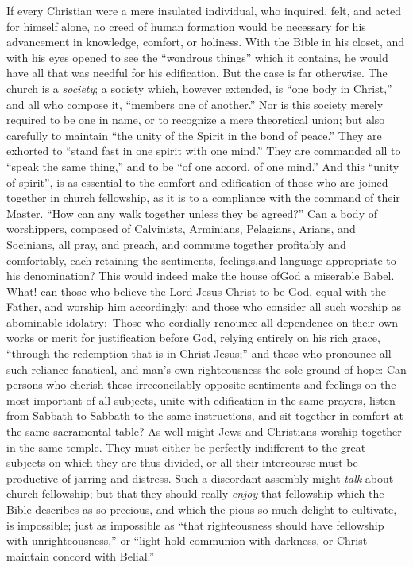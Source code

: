 \documentclass[
]{book}
\begin{document}
If every Christian were a mere insulated individual, who inquired, felt, and acted for himself alone, no creed of human formation would be necessary for his advancement in knowledge, comfort, or holiness. With the Bible in his closet, and with his eyes opened to see the ``wondrous things'' which it contains, he would have all that was needful for his edification. But the case is far otherwise. The church is a \emph{society}; a society which, however extended, is ``one body in Christ,'' and all who compose it, ``members one of another.'' Nor is this society merely required to be one in name, or to recognize a mere theoretical union; but also carefully to maintain ``the unity of the Spirit in the bond of peace.'' They are exhorted to ``stand fast in one spirit with one mind.'' They are commanded all to ``speak the same thing,'' and to be ``of one accord, of one mind.'' And this ``unity of spirit'', is as essential to the comfort and edification of those who are joined together in church fellowship, as it is to a compliance with the command of their Master. ``How can any walk together unless they be agreed?'' Can a body of worshippers, composed of Calvinists, Arminians, Pelagians, Arians, and Socinians, all pray, and preach, and commune together profitably and comfortably, each retaining the sentiments, feelings,and language appropriate to his denomination? This would indeed make the house ofGod a miserable Babel. What! can those who believe the Lord Jesus Christ to be God, equal with the Father, and worship him accordingly; and those who consider all such worship as abominable idolatry:--Those who cordially renounce all dependence on their own works or merit for justification before God, relying entirely on his rich grace, ``through the redemption that is in Christ Jesus;'' and those who pronounce all such reliance fanatical, and man's own righteousness the sole ground of hope: Can persons who cherish these irreconcilably opposite sentiments and feelings on the most important of all subjects, unite with edification in the same prayers, listen from Sabbath to Sabbath to the same instructions, and sit together in comfort at the same sacramental table? As well might Jews and Christians worship together in the same temple. They must either be perfectly indifferent to the great subjects on which they are thus divided, or all their intercourse must be productive of jarring and distress. Such a discordant assembly might \emph{talk} about church fellowship; but that they should really \emph{enjoy} that fellowship which the Bible describes as so precious, and which the pious so much delight to cultivate, is impossible; just as impossible as ``that righteousness should have fellowship with unrighteousness,'' or ``light hold communion with darkness, or Christ maintain concord with Belial.''
\end{document}
